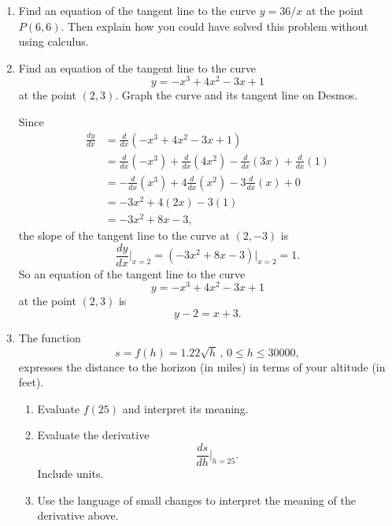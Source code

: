 \documentclass{ximera}
\begin{document}
\begin{question}  \label{Qdsfsdfre}
\begin{enumerate}

\item Find an equation of the tangent line to the curve $y=36/x$ at the point $P(6,6)$. Then explain how you could have solved this problem without using calculus.

\item Find an equation of the tangent line to the curve
\[
      y = -x^3 + 4x^2 -3x + 1
\] 
at the point $(2,3)$. Graph the curve and its tangent line on Desmos. 

\begin{explanation}
Since
\begin{align*}
\frac{dy}{dx}  &= \frac{d}{dx}\left( -x^3 + 4x^2 -3x + 1  \right) \\
                      &= \frac{d}{dx}(-x^3) +  \frac{d}{dx}(4x^2) -  \frac{d}{dx}(3x) +  \frac{d}{dx}(1) \\
                      &= -\frac{d}{dx}(x^3) +  4\frac{d}{dx}(x^2) - 3\frac{d}{dx}(x) + 0\\
                      &= -3x^2 + 4(2x) - 3(1) \\
                      &= -3x^2 + 8x - 3 ,
\end{align*}
the slope of the tangent line to the curve at $(2,-3)$ is
\[
  \frac{dy}{dx} \Big|_{x=2} = \left(  -3x^2 + 8x - 3 \right)\Big|_{x=2} = 1.
\]
So an equation of the tangent line to the curve 
\[
      y = -x^3 + 4x^2 -3x + 1
\] 
at the point $(2,3)$ is
\[
 y - 2 = x + 3.
\]
\end{explanation}

\item The function
\[
     s = f(h) = 1.22 \sqrt{h} \, , \, 0\leq h \leq 30000 ,
\]
expresses the distance to the horizon (in miles) in terms of your altitude (in feet).

\begin{enumerate}
\item Evaluate $f(25)$ and interpret its meaning.

\item Evaluate the derivative 
\[
    \frac{ds}{dh}\Big|_{h=25} .
\]
Include units.

\item Use the language of small changes to interpret the meaning of the derivative above.

\end{enumerate}

\end{enumerate}
\end{question}
\end{document}
